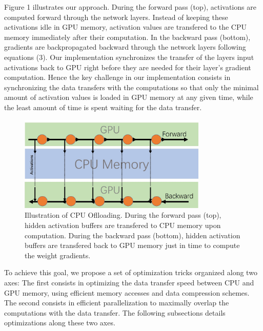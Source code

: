 \documentclass[11pt,onecolumn]{article}
\begin{document}
Figure 1 illustrates our approach. 
During the forward pass (top), activations are computed forward through the network layers.
Instead of keeping these activations idle in GPU memory, activation values are transfered to 
the CPU memory immediately after their computation.
In the backward pass (bottom), gradients are backpropagated backward 
through the network layers following equations (3).
Our implementation synchronizes the transfer of the layers input activations back to GPU
right before they are needed for their layer's gradient computation.
Hence the key challenge in our implementation consists in synchronizing the data
transfers with the computations so that only the minimal amount of activation values 
is loaded in GPU memory at any given time, while the least amount of time is spent 
waiting for the data transfer.

\begin{figure}[h!]
\centering
\includegraphics[width=0.8\textwidth]{Figure1.jpg}
\caption{Illustration of CPU Oflloading. 
During the forward pass (top), 
hidden activation buffers are transfered to CPU memory upon computation.
During the backward pass (bottom), hidden activation buffers 
are transfered back to GPU memory just in time to compute the 
weight gradients.}
\end{figure}

To achieve this goal, we propose a set of optimization tricks organized along two axes:
The first consists in optimizing the data transfer speed between CPU and GPU memory,
using efficient memory accesses and data compression schemes.
The second consists in efficient parallelization to maximally overlap the computations
with the data transfer.
The following subsections details optimizations along these two axes.
\end{document}
